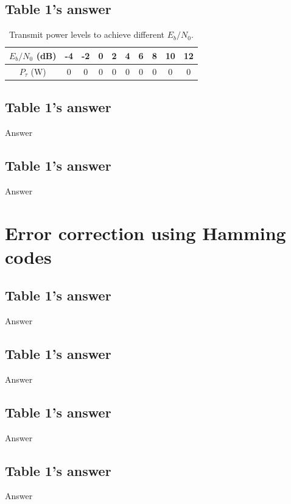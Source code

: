 \documentclass[11pt]{article}
\begin{document}
\subsection{Table 1's answer}

\begin{table}[h]
\centering
\begin{tabular}{|c|c|c|c|c|c|c|c|c|c|}

\hline
$E_{b}/N_{0}$ (dB) & -4 & -2 & 0 & 2 & 4 & 6 & 8 & 10 & 12 \\\hline
$P_{\tau}$ (W) & 0 & 0 & 0 & 0 & 0 & 0 & 0 & 0 & 0 \\\hline             %

\end{tabular}
\caption{\label{tab:transmit_power_levels}Transmit power levels to achieve different $E_{b}/N_{0}$.}
\end{table}

\subsection{Table 1's answer}
Answer
\subsection{Table 1's answer}
Answer
\section{Error correction using Hamming codes}
\subsection{Table 1's answer}
Answer
\subsection{Table 1's answer}
Answer
\subsection{Table 1's answer}
Answer
\subsection{Table 1's answer}
Answer
\end{document}

